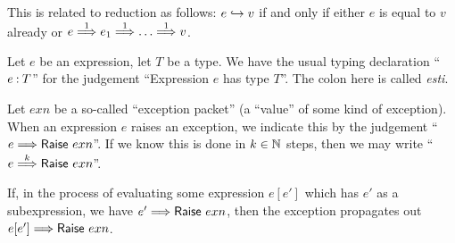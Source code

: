 \begin{node}
\begin{node}
This is related to reduction as follows: $e\hookrightarrow v$ if and only if either
$e$ is equal to $v$ already or $e\Reduces{1}e_{1}\Reduces{1}\dots\Reduces{1}v$.
\end{node}

\begin{node}\label{sml-000C}%
Let $e$ be an expression, let $T$ be a type. We have the usual typing
declaration ``$e\mathbin{:} T$'' for the judgement ``Expression $e$ has type $T$''.
The colon here is called \textit{esti}.
\end{node}

\begin{node}\label{sml-000F}%
Let $exn$ be a so-called ``exception packet'' (a ``value'' of some kind
of exception). When an expression $e$ raises an exception, we indicate
this by the judgement ``$e\Reduces{}\Raise{exn}$''. If we know this is done
in $k\in\mathbb{N}$ steps, then we may write ``$e\Reduces{k}\Raise{exn}$''.

If, in the process of evaluating some expression $e[e']$ which has $e'$
as a subexpression, we have $e'\Reduces{}\Raise{exn}$, then
the exception propagates out $e[e']\Reduces{}\Raise{exn}$.
\end{node}
\end{node}

